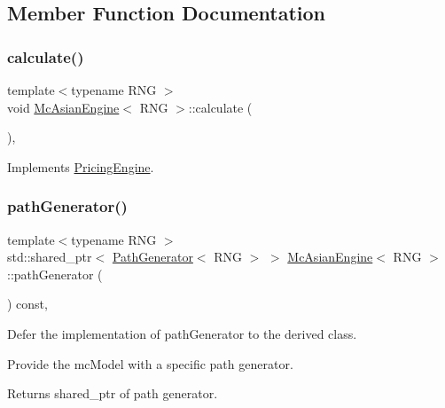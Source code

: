 \subsection{Member Function Documentation}
\hypertarget{class_mc_asian_engine_ac16f4259846f55dc6c02d0b628f34e63}{}\label{class_mc_asian_engine_ac16f4259846f55dc6c02d0b628f34e63} 
\subsubsection{\texorpdfstring{calculate()}{calculate()}}
{\footnotesize\ttfamily template$<$typename R\+NG $>$ \\
void \hyperlink{class_mc_asian_engine}{Mc\+Asian\+Engine}$<$ R\+NG $>$\+::calculate (\begin{DoxyParamCaption}{ }\end{DoxyParamCaption})\hspace{0.3cm}{\ttfamily [override]}, {\ttfamily [virtual]}}



Implements \hyperlink{class_pricing_engine_a733511ffc3cf5e4dc1fbc2a39208d8bd}{Pricing\+Engine}.

\hypertarget{class_mc_asian_engine_aafae065fc8b31b009b4b42a53b850e82}{}\label{class_mc_asian_engine_aafae065fc8b31b009b4b42a53b850e82} 
\subsubsection{\texorpdfstring{path\+Generator()}{pathGenerator()}}
{\footnotesize\ttfamily template$<$typename R\+NG $>$ \\
std\+::shared\+\_\+ptr$<$ \hyperlink{class_path_generator}{Path\+Generator}$<$ R\+NG $>$ $>$ \hyperlink{class_mc_asian_engine}{Mc\+Asian\+Engine}$<$ R\+NG $>$\+::path\+Generator (\begin{DoxyParamCaption}{ }\end{DoxyParamCaption}) const\hspace{0.3cm}{\ttfamily [override]}, {\ttfamily [virtual]}}



Defer the implementation of path\+Generator to the derived class. 

Provide the mc\+Model with a specific path generator. \begin{DoxyReturn}{Returns}
shared\+\_\+ptr of path generator. 
\end{DoxyReturn}



